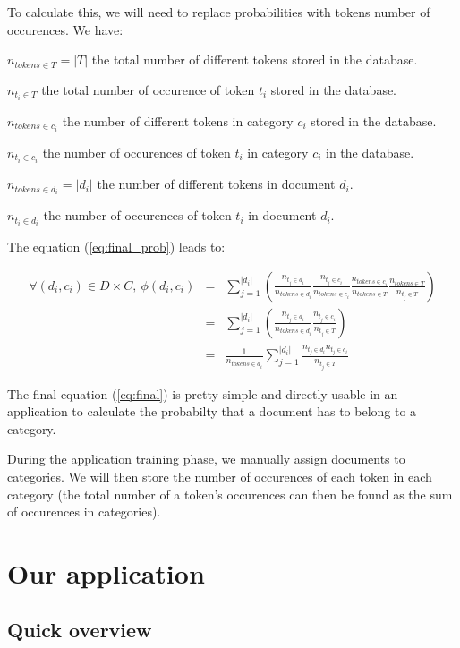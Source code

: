\documentclass[a4paper,11pt]{article}
\begin{document}
To calculate this, we will need to replace probabilities with tokens number of
occurences. We have:

$n_{tokens \in T} = |T|$ the total number of different tokens stored in the
database.

$n_{t_i \in T}$ the total number of occurence of token $t_i$ stored in the
database.

$n_{tokens \in c_i}$ the number of different tokens in category $c_i$ stored
in the database.

$n_{t_i \in c_i}$ the number of occurences of token $t_i$ in category $c_i$
in the database.

$n_{tokens \in d_i} = |d_i|$ the number of different tokens in document $d_i$.

$n_{t_i \in d_i}$ the number of occurences of token $t_i$ in document $d_i$.

The equation (\ref{eq:final_prob}) leads to:

\begin{eqnarray}\label{eq:final}
    \forall (d_i, c_i) \in D \times C,\ 
    \phi(d_i, c_i)
    &=& \sum_{j=1}^{|d_i|} (
        \frac{n_{t_j \in d_i}}{n_{tokens \in d_i}}
        \frac{n_{t_j \in c_i}}{n_{tokens \in c_i}}
        \frac{n_{tokens \in c_i}}{n_{tokens \in T}}
        \frac{n_{tokens \in T}}{n_{t_j \in T}}
    ) \nonumber \\
    &=& \sum_{j=1}^{|d_i|} (
        \frac{n_{t_j \in d_i}}{n_{tokens \in d_i}}
        \frac{n_{t_j \in c_i}}{n_{t_j \in T}}
    ) \nonumber \\
    &=& \frac{1}{n_{tokens \in d_i}}
        \sum_{j=1}^{|d_i|}
        \frac{n_{t_j \in d_i} n_{t_j \in c_i}}{n_{t_j \in T}}
\end{eqnarray}

The final equation (\ref{eq:final}) is pretty simple and directly usable in
an application to calculate the probabilty that a document has to belong to
a category.

During the application training phase, we manually assign documents to
categories. We will then store the number of occurences of each token in each
category (the total number of a token's occurences can then be found as the
sum of occurences in categories).

\section{Our application}

\subsection{Quick overview}
\end{document}
